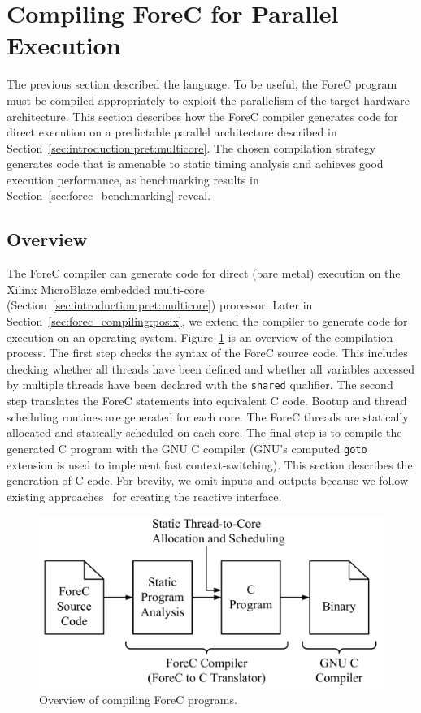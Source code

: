 \section{Compiling ForeC for Parallel Execution}
\label{sec:forec_compiling}
The previous section described the language. To be useful, 
the ForeC program must be compiled 
appropriately to exploit the parallelism of the target
hardware architecture. This section describes how the 
ForeC compiler generates code for direct 
execution on a predictable parallel architecture
described in Section~\ref{sec:introduction:pret:multicore}. The
chosen compilation strategy generates code that is 
amenable to static timing analysis and achieves good
execution performance, as benchmarking results in 
Section~\ref{sec:forec_benchmarking} reveal.

\subsection{Overview}
The ForeC compiler can generate code for direct (bare metal) 
execution on the Xilinx MicroBlaze embedded multi-core 
(Section~\ref{sec:introduction:pret:multicore}) 
processor. Later in Section~\ref{sec:forec_compiling:posix}, 
we extend the compiler to generate code for execution 
on an operating system.
Figure~\ref{fig:forec_compiling:overview} is
an overview of the compilation process. The first step 
checks the syntax of the ForeC source code. This includes
checking whether all threads have been defined and whether
all variables accessed by multiple threads have been
declared with the \verb$shared$ qualifier. The second step
translates the ForeC statements into equivalent C code.
Bootup and thread scheduling routines are generated for
each core. The ForeC threads are statically allocated and
statically scheduled on each core.
The final step is to compile the generated 
C program with the GNU C compiler (GNU's 
computed \verb$goto$ extension is used to implement fast
context-switching). This section describes
the generation of C code. 
For brevity, we omit inputs and outputs 
because we follow existing approaches~\cite{timed_compiling_esterel} for
creating the reactive interface.

\begin{figure}
	\centering

	\includegraphics[width=0.6\columnwidth]{images/compilation_embedded_overview.pdf}

	\caption{Overview of compiling ForeC programs.}
	\label{fig:forec_compiling:overview}
\end{figure}

